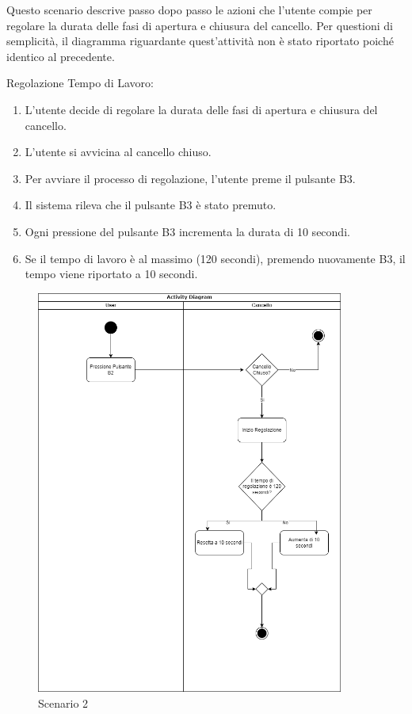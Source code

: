 Questo scenario descrive passo dopo passo le azioni che l’utente compie per regolare la durata delle fasi di apertura e chiusura del cancello. Per questioni di semplicità, il diagramma riguardante quest'attività non è stato riportato poiché identico al precedente.

\noindent Regolazione Tempo di Lavoro:

\begin{enumerate}
\item L’utente decide di regolare la durata delle fasi di apertura e chiusura del cancello.
\item L’utente si avvicina al cancello chiuso.
\item Per avviare il processo di regolazione, l’utente preme il pulsante B3.
\item Il sistema rileva che il pulsante B3 è stato premuto.
\item Ogni pressione del pulsante B3 incrementa la durata di 10 secondi.
\item Se il tempo di lavoro è al massimo (120 secondi), premendo nuovamente B3, il tempo viene riportato a 10 secondi.
\end{enumerate}


\begin{figure}[H]
    \centering
    \includegraphics[width=0.9\textwidth]{figures/scenario2.drawio.png}
    \caption{Scenario 2}
    \label{scenario2}
\end{figure}


